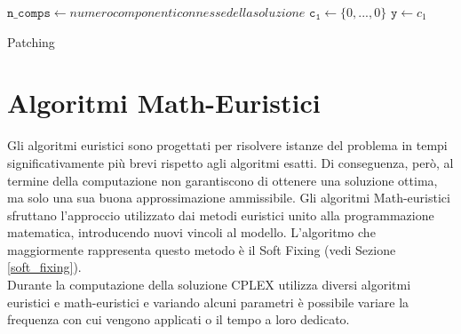 \begin{algorithm}[h]
\DontPrintSemicolon
{}
\BlankLine
$\mathtt{n\_comps \gets} numero componenti connesse della soluzione$\;
\BlankLine
$\mathtt{c_1\gets}\{0,...,0\}$\;
\BlankLine
{}
$\mathtt{y \gets} c_1$\;
\caption{Patching}
\end{algorithm}

\section{Algoritmi Math-Euristici}
Gli algoritmi euristici sono progettati per risolvere istanze del problema in tempi significativamente più brevi rispetto agli algoritmi esatti. Di conseguenza, però, al termine della computazione non garantiscono di ottenere una soluzione ottima, ma solo una sua buona approssimazione ammissibile. Gli algoritmi Math-euristici sfruttano l'approccio utilizzato dai metodi euristici unito alla programmazione matematica, introducendo nuovi vincoli al modello. L'algoritmo che maggiormente rappresenta questo metodo è il Soft Fixing (vedi Sezione \ref{soft_fixing}). \\
Durante la computazione della soluzione CPLEX utilizza diversi algoritmi euristici e math-euristici e variando alcuni parametri è possibile variare la frequenza con cui vengono applicati o il tempo a loro dedicato. 

